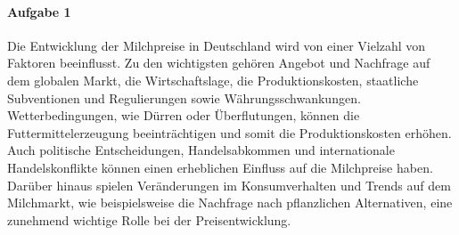 \documentclass[11pt,a4paper]{report}
\begin{document}
	\paragraph{Aufgabe 1}
	Die Entwicklung der Milchpreise in Deutschland wird von einer Vielzahl von Faktoren beeinflusst.
	Zu den wichtigsten gehören Angebot und Nachfrage auf dem globalen Markt, die Wirtschaftslage, die Produktionskosten, staatliche Subventionen und Regulierungen sowie Währungsschwankungen.
	Wetterbedingungen, wie Dürren oder Überflutungen, können die Futtermittelerzeugung beeinträchtigen und somit die Produktionskosten erhöhen.
	Auch politische Entscheidungen, Handelsabkommen und internationale Handelskonflikte können einen erheblichen Einfluss auf die Milchpreise haben.
	Darüber hinaus spielen Veränderungen im Konsumverhalten und Trends auf dem Milchmarkt, wie beispielsweise die Nachfrage nach pflanzlichen Alternativen, eine zunehmend wichtige Rolle bei der Preisentwicklung.
\end{document}
